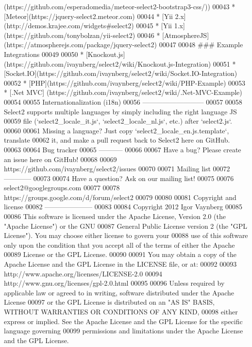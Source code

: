 \begin{DoxyCode}
       (https://github.com/esperadomedia/meteor-select2-bootstrap3-css/))
00043 * [Meteor](https://jquery-select2.meteor.com)
00044 * [Yii 2.x](http://demos.krajee.com/widgets#select2)
00045 * [Yii 1.x](https://github.com/tonybolzan/yii-select2)
00046 * [AtmosphereJS](https://atmospherejs.com/package/jquery-select2)
00047 
00048 ### Example Integrations
00049 
00050 * [Knockout.js](https://github.com/ivaynberg/select2/wiki/Knockout.js-Integration)
00051 * [Socket.IO](https://github.com/ivaynberg/select2/wiki/Socket.IO-Integration)
00052 * [PHP](https://github.com/ivaynberg/select2/wiki/PHP-Example)
00053 * [.Net MVC] (https://github.com/ivaynberg/select2/wiki/.Net-MVC-Example)
00054 
00055 Internationalization (i18n)
00056 ---------------------------
00057 
00058 Select2 supports multiple languages by simply including the right language JS
00059 file (`select2\_locale\_it.js`, `select2\_locale\_nl.js`, etc.) after `select2.js`.
00060 
00061 Missing a language? Just copy `select2\_locale\_en.js.template`, translate
00062 it, and make a pull request back to Select2 here on GitHub.
00063 
00064 Bug tracker
00065 -----------
00066 
00067 Have a bug? Please create an issue here on GitHub!
00068 
00069 https://github.com/ivaynberg/select2/issues
00070 
00071 Mailing list
00072 ------------
00073 
00074 Have a question? Ask on our mailing list!
00075 
00076 select2@googlegroups.com
00077 
00078 https://groups.google.com/d/forum/select2
00079 
00080 
00081 Copyright and license
00082 ---------------------
00083 
00084 Copyright 2012 Igor Vaynberg
00085 
00086 This software is licensed under the Apache License, Version 2.0 (the "Apache License") or the GNU
00087 General Public License version 2 (the "GPL License"). You may choose either license to govern your
00088 use of this software only upon the condition that you accept all of the terms of either the Apache
00089 License or the GPL License.
00090 
00091 You may obtain a copy of the Apache License and the GPL License in the LICENSE file, or at:
00092 
00093 http://www.apache.org/licenses/LICENSE-2.0
00094 http://www.gnu.org/licenses/gpl-2.0.html
00095 
00096 Unless required by applicable law or agreed to in writing, software distributed under the Apache
       License
00097 or the GPL License is distributed on an "AS IS" BASIS, WITHOUT WARRANTIES OR CONDITIONS OF ANY KIND,
00098 either express or implied. See the Apache License and the GPL License for the specific language
       governing
00099 permissions and limitations under the Apache License and the GPL License.
\end{DoxyCode}

